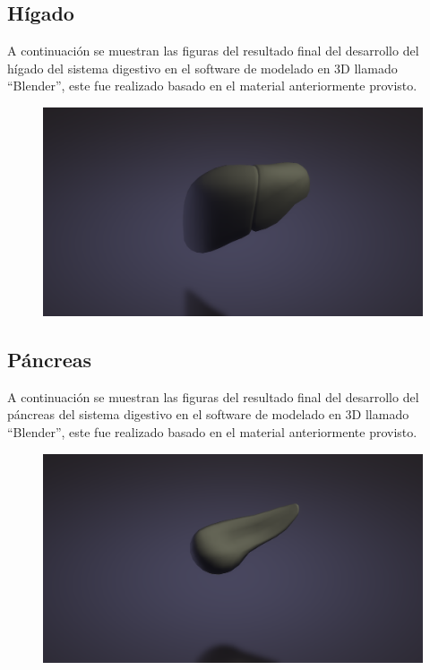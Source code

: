 \subsection{Hígado}
A continuación se muestran las figuras del resultado final del desarrollo del hígado del sistema digestivo en el software de modelado en 3D llamado “Blender”, este fue realizado basado en el material anteriormente provisto.\\
\begin{figure}[H]
	\begin{center}
 		\includegraphics[width = .5\textwidth]{source/images/image17.png}
	\end{center} 
\end{figure}

\subsection{Páncreas}
A continuación se muestran las figuras del resultado final del desarrollo del páncreas del sistema digestivo en el software de modelado en 3D llamado “Blender”, este fue realizado basado en el material anteriormente provisto.\\
\begin{figure}[H]
	\begin{center}
 		\includegraphics[width = .5\textwidth]{source/images/image19.png}
	\end{center} 
\end{figure}

